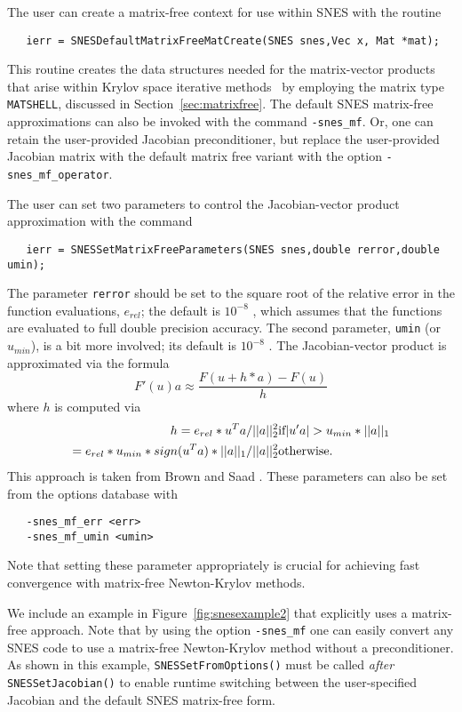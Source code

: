 The user can create a matrix-free context for use within SNES with 
the routine
\begin{verbatim}
   ierr = SNESDefaultMatrixFreeMatCreate(SNES snes,Vec x, Mat *mat);
\end{verbatim}
This routine creates the data structures needed for the matrix-vector 
products that arise within Krylov space iterative methods~\cite{brownsaad:90}
by employing the matrix type {\tt MATSHELL}, 
discussed in Section~\ref{sec:matrixfree}.  The default SNES matrix-free
approximations can also be invoked with the command {\tt -snes\_mf}. 
Or, one can retain the user-provided Jacobian preconditioner, but replace the 
user-provided Jacobian matrix with the default matrix free variant with the
option {\tt -snes\_mf\_operator}. 

The user can set two parameters to control the Jacobian-vector
product approximation with the command
\begin{verbatim}
   ierr = SNESSetMatrixFreeParameters(SNES snes,double rerror,double umin);
\end{verbatim}
The parameter {\tt rerror} should be set to the square root of the 
relative error in the function evaluations, $e_{rel}$; the default is $ 10^{-8} $ , which assumes
that the functions are evaluated to full double precision accuracy. 
The 
second parameter, {\tt umin} (or $u_{min}$), is a bit more involved; its default is 
$ 10^{-8} $ . The Jacobian-vector product is approximated via the formula
\[
    F'(u) a \approx \frac{F(u + h*a) - F(u)}{h}
\]
where $ h $ is computed via 
\begin{eqnarray*}
        h = e_{rel}*u^{T}a/||a||^2_2                       &    \hbox{if}  |u'a| > u_{min}*||a||_{1} \\
          = e_{rel}*u_{min}*sign(u^{T}a)*||a||_{1}/||a||^2_2  &    \hbox{otherwise}.
\end{eqnarray*}
This approach is taken from Brown and Saad \cite{brownsaad:90}.
These parameters can also be set from the options database with 
\begin{verbatim}
   -snes_mf_err <err>
   -snes_mf_umin <umin>
\end{verbatim}
 
Note that setting these parameter appropriately is crucial for achieving
fast convergence with matrix-free Newton-Krylov methods.  

We include an example in Figure~\ref{fig:snesexample2} that explicitly
uses a matrix-free approach.  Note that by using the option 
{\tt -snes\_mf} one can easily convert any SNES code to use a matrix-free
Newton-Krylov method without a preconditioner.  As shown in this
example, {\tt SNESSetFromOptions()} must be called {\em after}
{\tt SNESSetJacobian()} to enable runtime switching between the
user-specified Jacobian and the default SNES matrix-free form.

